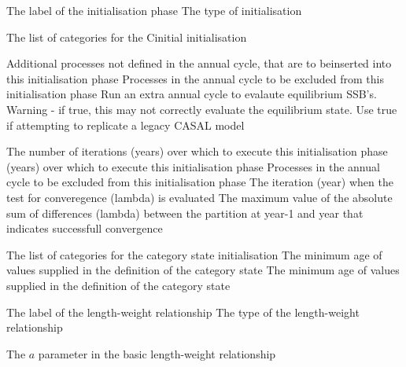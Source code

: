  {The label of the initialisation phase}
 {The type of initialisation}
\par\textbf{}\par
{} {The list of categories for the Cinitial initialisation}
\par\textbf{}\par
{} {Additional processes not defined in the annual cycle, that are to beinserted into this initialisation phase}
 {Processes in the annual cycle to be excluded from this initialisation phase}
 {Run an extra annual cycle to evalaute equilibrium SSB's. Warning - if true, this may not correctly evaluate the equilibrium state. Use true if attempting to replicate a legacy CASAL model}
\par\textbf{}\par
{} {The number of iterations (years) over which to execute this initialisation phase}
 {(years) over which to execute this initialisation phase}
 {Processes in the annual cycle to be excluded from this initialisation phase}
 {The iteration (year) when the test for converegence (lambda) is evaluated}
 {The maximum value of the absolute sum of differences (lambda) between the partition at year-1 and year that indicates successfull convergence}
\par\textbf{}\par
{} {The list of categories for the category state initialisation}
 {The minimum age of values supplied in the definition of the category state}
 {The minimum age of values supplied in the definition of the category state}
\par\par
{} {The label of the length-weight relationship}
 {The type of the length-weight relationship}
\par\textbf{}\par
{} {The $a$ parameter in the basic length-weight relationship}

